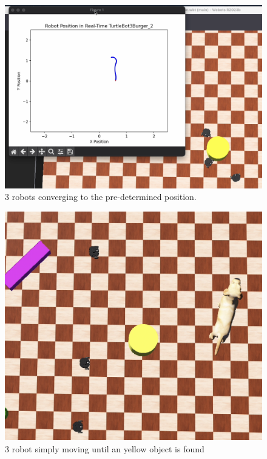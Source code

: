 \begin{figure}
    \centering
    \includegraphics[width=0.5\linewidth]{assets/images/simulation_overview/sim_2.png}
    \caption{3 robots converging to the pre-determined position.}
    \label{fig:object detection figure 2}
\end{figure}

\begin{figure}
    \centering
    \includegraphics[width=0.5\linewidth]{assets/images/simulation_overview/sim_3.png}
    \caption{3 robot simply moving until an yellow object is found}
    \label{fig:object detection figure 2}
\end{figure}